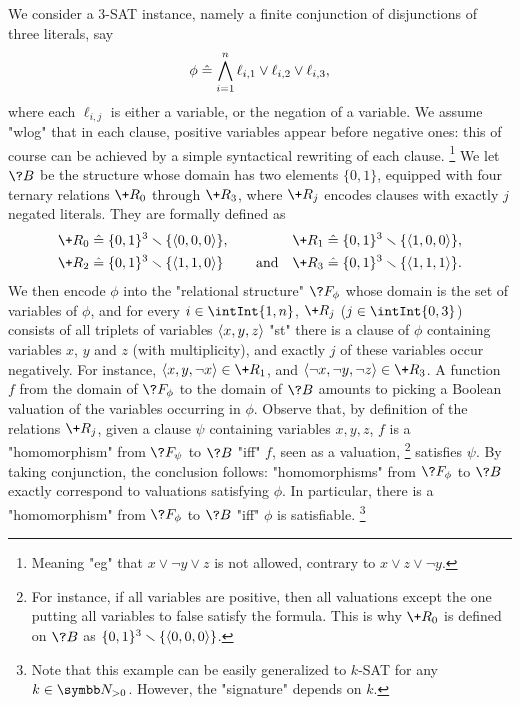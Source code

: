 \begin{example}
	\AP\label{ex:sat-as-hom}
	We consider a 3-SAT instance, namely a finite conjunction of
	disjunctions of three literals, say
	\[
		\phi \mathrel{\hat{=}} \bigwedge_{i=1}^n \ell_{i,1} \lor \ell_{i,2} \lor \ell_{i,3},
	\]
	where each $\ell_{i,j}$ is either a variable, or the negation of a variable.
	We assume "wlog" that in each clause, positive variables appear before negative ones:
	this of course can be achieved by a simple syntactical rewriting of each clause.%
	\footnote{Meaning "eg" that $x \lor \neg y \lor z$ is not allowed, contrary to
	$x \lor z \lor \neg y$.}
	We let $\?B$ be the structure whose domain has two elements $\{0,1\}$,
	equipped with four ternary relations $\+R_0$ through $\+R_3$, where $\+R_j$ encodes clauses with exactly $j$ negated literals. They are formally defined as
	\begin{align*}
		\+R_0 & \defeq \set{0,1}^3 \smallsetminus \set{\tup{0,0,0}}, &
		\+R_1 & \defeq \set{0,1}^3 \smallsetminus \set{\tup{1,0,0}}, \\
		\+R_2 & \defeq \set{0,1}^3 \smallsetminus \set{\tup{1,1,0}} \qquad\text{ and} &
		\+R_3 & \defeq \set{0,1}^3 \smallsetminus \set{\tup{1,1,1}}.
	\end{align*}
	We then encode $\phi$ into the "relational structure" $\?F_\phi$
	whose domain is the set of variables of $\phi$,
	and for every $i \in \intInt{1,n}$,
	$\+R_j$ ($j\in\intInt{0,3}$) consists of all triplets of variables $\langle x,y,z\rangle$
	"st" there is a clause of $\phi$ containing variables $x$, $y$ and $z$ (with multiplicity), and exactly $j$ of these variables occur negatively.
	For instance, $\tup{x, y, \neg x} \in \+R_1$, and $\tup{\neg x, \neg y, \neg z} \in \+R_3$.
	A function $f$ from the domain of $\?F_\phi$ to the domain of $\?B$ amounts to picking
	a Boolean valuation of the variables occurring in $\phi$.
	Observe that, by definition of the relations $\+R_j$,
	given a clause $\psi$ containing variables $x,y,z$, 
	$f$ is a "homomorphism" from $\?F_\psi$ to $\?B$ "iff"
	$f$, seen as a valuation,%
	\footnote{For instance,
	if all variables are positive, then all valuations except the one putting
	all variables to false satisfy the formula. This is why $\+R_0$ is defined
	on $\?B$ as $\{0,1\}^3\smallsetminus \{\langle0,0,0\rangle\}$.}
	satisfies $\psi$.
	By taking conjunction, the conclusion follows: "homomorphisms" from
	$\?F_\phi$ to $\?B$ exactly correspond to valuations satisfying $\phi$.
	In particular, there is a "homomorphism" from $\?F_\phi$ to $\?B$ "iff"
	$\phi$ is satisfiable.%
	\footnote{Note that this example can be easily generalized to $k$-SAT for any $k\in\Np$.
	However, the "signature" depends on $k$.}
\end{example}

